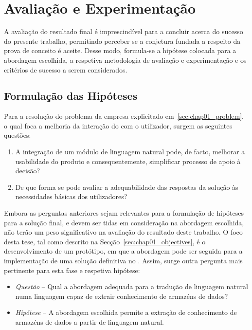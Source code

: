\section{Avaliação e Experimentação}
\label{sec:chap01_solutionevaluation}
A avaliação do resultado final é imprescindível para a concluir acerca do sucesso do presente trabalho, permitindo perceber se a conjetura fundada a respeito da prova de conceito é aceite. Desse modo, formula-se a hipótese colocada para a abordagem escolhida, a respetiva metodologia de avaliação e experimentação e os critérios de sucesso a serem considerados.

\subsection{Formulação das Hipóteses}
\label{sec:chap01_hypothesis}
Para a resolução do problema da empresa explicitado em~\ref{sec:chap01_problem}, o qual foca a melhoria da interação do {\productname} com o utilizador, surgem as seguintes questões:

\begin{enumerate}
    \item
    {
        A integração de um módulo de linguagem natural pode, de facto, melhorar a usabilidade do produto e consequentemente, simplificar processo de apoio à decisão?
    }
    \item
    {
        De que forma se pode avaliar a adequabilidade das respostas da solução às necessidades básicas dos utilizadores?
    }
\end{enumerate}

Embora as perguntas anteriores sejam relevantes para a formulação de hipóteses para a solução final, e devem ser tidas em consideração na abordagem escolhida, não terão um peso significativo na avaliação do resultado deste trabalho. O foco desta tese, tal como descrito na Secção~\ref{sec:chap01_objectives}, é o desenvolvimento de um protótipo, em que a abordagem pode ser seguida para a implementação de uma solução definitiva no {\productname}. Assim, surge outra pergunta mais pertinente para esta fase e respetiva hipótese:

\begin{itemize}
    \item
    {  
        \textit{Questão} -- Qual a abordagem adequada para a tradução de linguagem natural numa linguagem capaz de extrair conhecimento de armazéns de dados?
    }
    \item
    {
        \textit{Hipótese} -- A abordagem escolhida permite a extração de conhecimento de armazéns de dados a partir de linguagem natural.
    }
\end{itemize}

